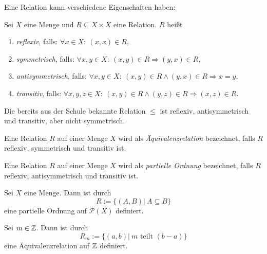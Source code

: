 \begin{frame}
Eine Relation kann verschiedene Eigenschaften haben:

\begin{mydef}
Sei $X$ eine Menge und $R \subseteq X \times X$ eine Relation.
$R$ heißt
\begin{enumerate}
\item \textit{reflexiv}, falls: $\forall x \in X\!:\ (x,x) \in R$,

\item \textit{symmetrisch}, falls:
$\forall x,y \in X\!:\ (x,y) \in R \Rightarrow (y,x) \in R$,

\item \textit{antisymmetrisch}, falls:
$\forall x,y \in X\!:\ (x,y) \in R \wedge (y,x) \in R \Rightarrow x = y$,

\item \textit{transitiv}, falls:
$\forall x,y,z \in X\!:\ (x,y) \in R \wedge (y,z) \in R
\Rightarrow (x,z) \in R$.
\end{enumerate}
\end{mydef}

\begin{example}
Die bereits aus der Schule bekannte Relation $\leq$ ist reflexiv,
antisymmetrisch und transitiv, aber nicht symmetrisch.
\end{example}
\end{frame}


\begin{frame}
\begin{mydef}
Eine Relation $R$ auf einer Menge $X$ wird als \textit{Äquivalenzrelation}
bezeichnet, falls $R$ reflexiv, symmetrisch und transitiv ist.
\end{mydef}

\begin{mydef}
Eine Relation $R$ auf einer Menge $X$ wird als \textit{partielle Ordnung}
bezeichnet, falls $R$ reflexiv, antisymmetrisch und transitiv ist.
\end{mydef}
\end{frame}


\begin{frame}
\begin{proposition}
Sei $X$ eine Menge.
Dann ist durch
\[
  R := \{ (A,B) | \  A \subseteq B \}
\]
eine partielle Ordnung auf $\mathcal{P}(X)$ definiert.
\end{proposition}

\begin{proposition}
Sei $m \in \mathbb{Z}$.
Dann ist durch
\[
    R_m := \{(a,b) | \ m \text{ teilt } (b-a) \}
\]
eine Äquivalenzrelation auf $\mathbb{Z}$ definiert.
\end{proposition}
\end{frame}


